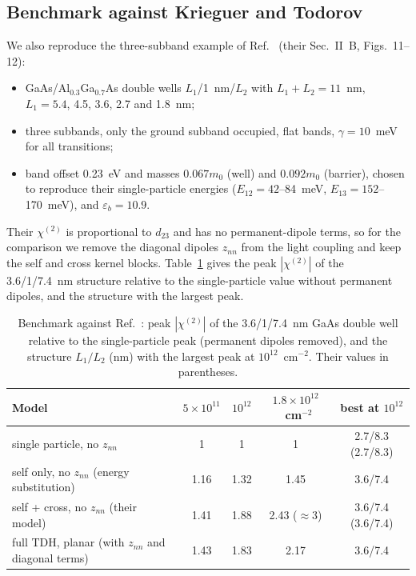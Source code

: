 \documentclass[11pt]{article}
\newcommand{\chitwo}{\chi^{(2)}}
\begin{document}
\subsection{Benchmark against Krieguer and Todorov}\label{sec:benchkt}
We also reproduce the three-subband example of Ref.~\cite{Krieguer2024} (their Sec.~II~B, Figs.~11--12):
\begin{itemize}
\item GaAs/Al$_{0.3}$Ga$_{0.7}$As double wells $L_1$/1~nm/$L_2$ with $L_1+L_2=11$~nm, $L_1=5.4$, 4.5, 3.6, 2.7 and 1.8~nm;
\item three subbands, only the ground subband occupied, flat bands, $\gamma=10$~meV for all transitions;
\item band offset 0.23~eV and masses $0.067m_0$ (well) and $0.092m_0$ (barrier), chosen to reproduce their single-particle energies ($E_{12}=42$--84~meV, $E_{13}=152$--170~meV), and $\varepsilon_b=10.9$.
\end{itemize}
Their $\chitwo$ is proportional to $d_{23}$ and has no permanent-dipole terms, so for the comparison we remove the diagonal dipoles $z_{nn}$ from the light coupling and keep the self and cross kernel blocks. Table~\ref{tab:kt} gives the peak $|\chitwo|$ of the 3.6/1/7.4~nm structure relative to the single-particle value without permanent dipoles, and the structure with the largest peak.

\begin{table}[!t]\centering\small
\caption{Benchmark against Ref.~\cite{Krieguer2024}: peak $|\chitwo|$ of the 3.6/1/7.4~nm GaAs double well relative to the single-particle peak (permanent dipoles removed), and the structure $L_1/L_2$ (nm) with the largest peak at $10^{12}$~cm$^{-2}$. Their values in parentheses.}
\label{tab:kt}
\setlength{\tabcolsep}{4pt}
\begin{tabular}{lcccc}
\toprule
Model & $5\times10^{11}$ & $10^{12}$ & $1.8\times10^{12}$~cm$^{-2}$ & best at $10^{12}$\\
\midrule
single particle, no $z_{nn}$ & 1 & 1 & 1 & 2.7/8.3 (2.7/8.3)\\
self only, no $z_{nn}$ (energy substitution) & 1.16 & 1.32 & 1.45 & 3.6/7.4\\
self + cross, no $z_{nn}$ (their model) & 1.41 & 1.88 & 2.43 ($\approx3$) & 3.6/7.4 (3.6/7.4)\\
full TDH, planar (with $z_{nn}$ and diagonal terms) & 1.43 & 1.83 & 2.17 & 3.6/7.4\\
\bottomrule
\end{tabular}
\end{table}
\end{document}

